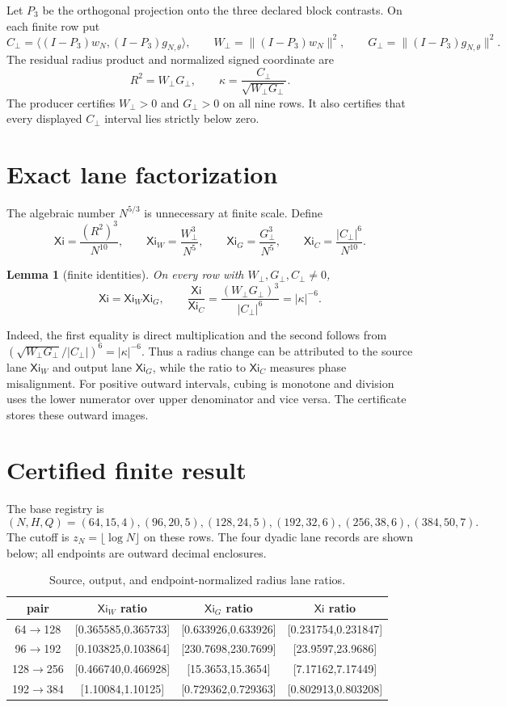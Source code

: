 \documentclass[11pt]{article}
\newcommand{\XiN}{\mathsf{Xi}}
\newcommand{\Xiw}{\mathsf{Xi}_{W}}
\newcommand{\Xig}{\mathsf{Xi}_{G}}
\newcommand{\Xic}{\mathsf{Xi}_{C}}
\newcommand{\Rtwo}{R^2}
\newcommand{\Cp}{C_{\perp}}
\newcommand{\Wp}{W_{\perp}}
\newcommand{\Gp}{G_{\perp}}
\newtheorem{lemma}{Lemma}
\begin{document}
Let $P_3$ be the orthogonal projection onto the three declared block
contrasts.  On each finite row put
\[
 \Cp=\langle(I-P_3)w_N,(I-P_3)g_{N,\theta}\rangle,\qquad
 \Wp=\|(I-P_3)w_N\|^2,\qquad
 \Gp=\|(I-P_3)g_{N,\theta}\|^2.
\]
The residual radius product and normalized signed coordinate are
\[
 \Rtwo=\Wp\Gp,\qquad
 \kappa=\frac{\Cp}{\sqrt{\Wp\Gp}}.
\]
The producer certifies $\Wp>0$ and $\Gp>0$ on all nine rows.  It also
certifies that every displayed $\Cp$ interval lies strictly below zero.

\section{Exact lane factorization}

The algebraic number $N^{5/3}$ is unnecessary at finite scale.  Define
\[
 \XiN=\frac{(\Rtwo)^3}{N^{10}},\qquad
 \Xiw=\frac{\Wp^3}{N^5},\qquad
 \Xig=\frac{\Gp^3}{N^5},\qquad
 \Xic=\frac{|\Cp|^6}{N^{10}}.
\]

\begin{lemma}[finite identities]
On every row with $\Wp,\Gp,\Cp\ne0$,
\[
 \XiN=\Xiw\Xig,
 \qquad
 \frac{\XiN}{\Xic}
 =\frac{(\Wp\Gp)^3}{|\Cp|^6}=|\kappa|^{-6}.
\]
\end{lemma}

\noindent
Indeed, the first equality is direct multiplication and the second follows
from $(\sqrt{\Wp\Gp}/|\Cp|)^6=|\kappa|^{-6}$.  Thus a radius change can be
attributed to the source lane $\Xiw$ and output lane $\Xig$, while the ratio
to $\Xic$ measures phase misalignment.  For positive outward intervals,
cubing is monotone and division uses the lower numerator over upper
denominator and vice versa.  The certificate stores these outward images.

\section{Certified finite result}

The base registry is
\[
 (N,H,Q)=(64,15,4),(96,20,5),(128,24,5),
 (192,32,6),(256,38,6),(384,50,7).
\]
The cutoff is $z_N=\lfloor\log N\rfloor$ on these rows.  The four dyadic
lane records are shown below; all endpoints are outward decimal enclosures.

\begin{table}[h]
\centering
\scriptsize
\begin{tabular}{c@{\quad}c@{\quad}c@{\quad}c}
\toprule
pair & $\Xiw$ ratio & $\Xig$ ratio & $\XiN$ ratio\\
\midrule
64$\to$128 & [0.365585,0.365733] & [0.633926,0.633926] & [0.231754,0.231847]\\
96$\to$192 & [0.103825,0.103864] & [230.7698,230.7699] & [23.9597,23.9686]\\
128$\to$256 & [0.466740,0.466928] & [15.3653,15.3654] & [7.17162,7.17449]\\
192$\to$384 & [1.10084,1.10125] & [0.729362,0.729363] & [0.802913,0.803208]\\
\bottomrule
\end{tabular}
\caption{Source, output, and endpoint-normalized radius lane ratios.}
\end{table}
\end{document}
